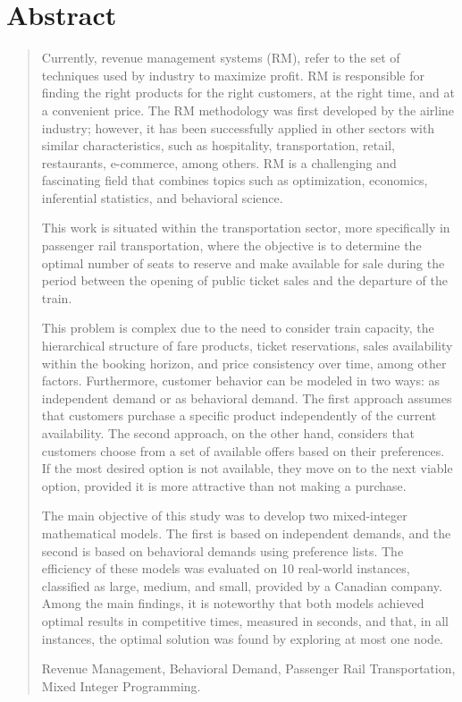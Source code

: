 \chapter*{Abstract}

\vspace{-1.0cm}
\begin{quotation}

    Currently, revenue management systems (RM), refer to the set of techniques used by industry to maximize profit. RM is responsible for finding the right products for the right customers, at the right time, and at a convenient price. The RM methodology was first developed by the airline industry; however, it has been successfully applied in other sectors with similar characteristics, such as hospitality, transportation, retail, restaurants, e-commerce, among others. RM is a challenging and fascinating field that combines topics such as optimization, economics, inferential statistics, and behavioral science.

    This work is situated within the transportation sector, more specifically in passenger rail transportation, where the objective is to determine the optimal number of seats to reserve and make available for sale during the period between the opening of public ticket sales and the departure of the train.
    
    This problem is complex due to the need to consider train capacity, the hierarchical structure of fare products, ticket reservations, sales availability within the booking horizon, and price consistency over time, among other factors. Furthermore, customer behavior can be modeled in two ways: as independent demand or as behavioral demand. The first approach assumes that customers purchase a specific product independently of the current availability. The second approach, on the other hand, considers that customers choose from a set of available offers based on their preferences. If the most desired option is not available, they move on to the next viable option, provided it is more attractive than not making a purchase.
    
    The main objective of this study was to develop two mixed-integer mathematical models. The first is based on independent demands, and the second is based on behavioral demands using preference lists. The efficiency of these models was evaluated on 10 real-world instances, classified as large, medium, and small, provided by a Canadian company. Among the main findings, it is noteworthy that both models achieved optimal results in competitive times, measured in seconds, and that, in all instances, the optimal solution was found by exploring at most one node.

\vspace{0.5cm}

 Revenue Management, Behavioral Demand, Passenger Rail Transportation, Mixed Integer Programming.

\end{quotation}